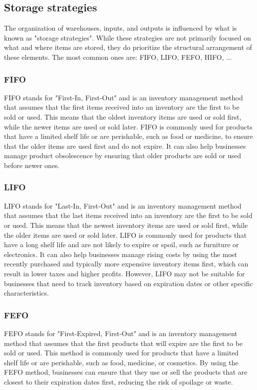 \subsection{Storage strategies}

The organization of warehouses, inputs, and outputs is influenced by what is known as "storage strategies". While these strategies are not primarily focused on what and where items are stored, they do prioritize the structural arrangement of these elements. The most common ones are: FIFO, LIFO, FEFO, HIFO, ...

\subsubsection{FIFO}

FIFO stands for "First-In, First-Out" and is an inventory management method that assumes that the first items received into an inventory are the first to be sold or used. This means that the oldest inventory items are used or sold first, while the newer items are used or sold later. FIFO is commonly used for products that have a limited shelf life or are perishable, such as food or medicine, to ensure that the older items are used first and do not expire. It can also help businesses manage product obsolescence by ensuring that older products are sold or used before newer ones.
   
\subsubsection{LIFO}

LIFO stands for "Last-In, First-Out" and is an inventory management method that assumes that the last items received into an inventory are the first to be sold or used. This means that the newest inventory items are used or sold first, while the older items are used or sold later. LIFO is commonly used for products that have a long shelf life and are not likely to expire or spoil, such as furniture or electronics. It can also help businesses manage rising costs by using the most recently purchased and typically more expensive inventory items first, which can result in lower taxes and higher profits. However, LIFO may not be suitable for businesses that need to track inventory based on expiration dates or other specific characteristics.
    
\subsubsection{FEFO}

FEFO stands for "First-Expired, First-Out" and is an inventory management method that assumes that the first products that will expire are the first to be sold or used. This method is commonly used for products that have a limited shelf life or are perishable, such as food, medicine, or cosmetics. By using the FEFO method, businesses can ensure that they use or sell the products that are closest to their expiration dates first, reducing the risk of spoilage or waste.

\newpage